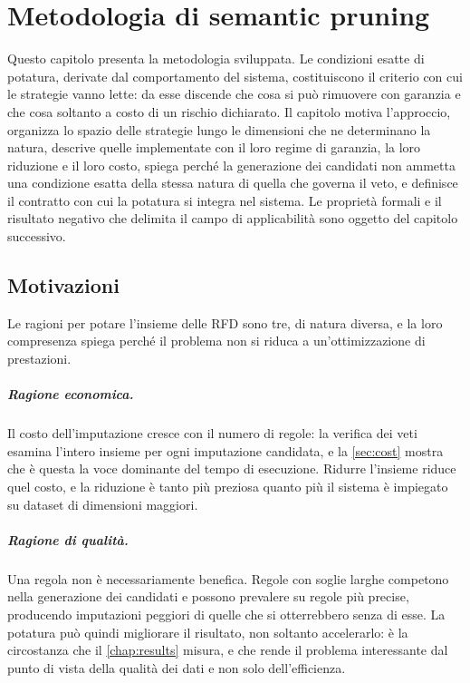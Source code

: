 \chapter{Metodologia di semantic pruning}\label{chap:methodology}


\noindent Questo capitolo presenta la metodologia sviluppata. Le condizioni esatte di potatura,
derivate dal comportamento del sistema, costituiscono il criterio con cui le strategie vanno
lette: da esse discende che cosa si può rimuovere con garanzia e che cosa soltanto a costo di un
rischio dichiarato. Il capitolo motiva l'approccio, organizza lo spazio delle strategie lungo le
dimensioni che ne determinano la natura, descrive quelle implementate con il loro regime di
garanzia, la loro riduzione e il loro costo, spiega perché la generazione dei candidati non
ammetta una condizione esatta della stessa natura di quella che governa il veto, e definisce il
contratto con cui la potatura si integra nel sistema. Le proprietà formali e il risultato negativo
che delimita il campo di applicabilità sono oggetto del capitolo successivo.

\section{Motivazioni}\label{sec:why-pruning}

Le ragioni per potare l'insieme delle RFD sono tre, di natura diversa, e la loro compresenza
spiega perché il problema non si riduca a un'ottimizzazione di prestazioni.

\paragraph{Ragione economica.} Il costo dell'imputazione cresce con il numero di regole: la
verifica dei veti esamina l'intero insieme per ogni imputazione candidata, e la
\autoref{sec:cost} mostra che è questa la voce dominante del tempo di esecuzione. Ridurre
l'insieme riduce quel costo, e la riduzione è tanto più preziosa quanto più il sistema è
impiegato su dataset di dimensioni maggiori.

\paragraph{Ragione di qualità.} Una regola non è necessariamente benefica. Regole con soglie
larghe competono nella generazione dei candidati e possono prevalere su regole più precise,
producendo imputazioni peggiori di quelle che si otterrebbero senza di esse. La potatura può
quindi migliorare il risultato, non soltanto accelerarlo: è la circostanza che il
\autoref{chap:results} misura, e che rende il problema interessante dal punto di vista della
qualità dei dati e non solo dell'efficienza.

